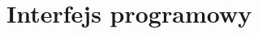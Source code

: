 \documentclass[00-praca-magisterska.tex]{subfiles}
\begin{document}
\chapter{Interfejs programowy}

\begin{spacing}{1.0}

\end{spacing}
\end{document}
